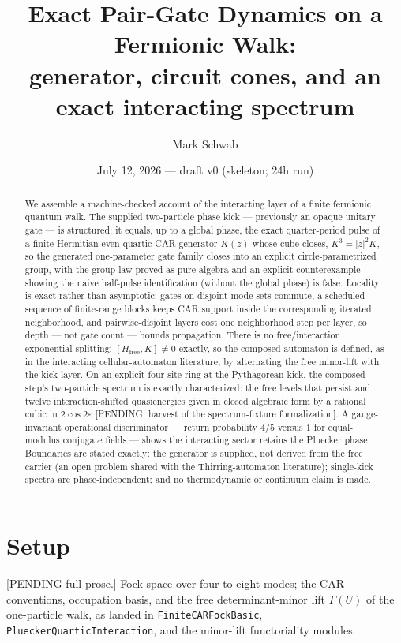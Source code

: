 \documentclass[11pt]{article}
\title{Exact Pair-Gate Dynamics on a Fermionic Walk:\\
generator, circuit cones, and an exact interacting spectrum}
\author{Mark Schwab}
\date{July 12, 2026 --- draft v0 (skeleton; 24h run)}
\begin{document}
\maketitle

\begin{abstract}
We assemble a machine-checked account of the interacting layer of a
finite fermionic quantum walk.  The supplied two-particle phase kick ---
previously an opaque unitary gate --- is structured: it equals, up to a
global phase, the exact quarter-period pulse of a finite Hermitian even
quartic CAR generator $K(z)$ whose cube closes, $K^3=|z|^2K$, so the
generated one-parameter gate family closes into an explicit
circle-parametrized group, with the group law proved as pure algebra and an explicit
counterexample showing the naive half-pulse identification (without the
global phase) is false.  Locality is exact rather than asymptotic:
gates on disjoint mode sets commute, a scheduled sequence of finite-range
blocks keeps CAR support inside the corresponding iterated neighborhood,
and pairwise-disjoint layers cost one neighborhood step per layer, so
depth --- not gate count --- bounds propagation.  There is no
free/interaction exponential splitting: $[H_{\mathrm{free}},K]\neq0$
exactly, so the composed automaton is defined, as in the interacting
cellular-automaton literature, by alternating the free minor-lift with
the kick layer.  On an explicit four-site ring at the Pythagorean kick,
the composed step's two-particle spectrum is exactly characterized:
the free levels that persist and twelve interaction-shifted quasienergies
given in closed algebraic form by a rational cubic in $2\cos2\varepsilon$
[PENDING: harvest of the spectrum-fixture formalization].  A
gauge-invariant operational discriminator --- return probability $4/5$
versus $1$ for equal-modulus conjugate fields --- shows the interacting
sector retains the Pluecker phase.  Boundaries are stated exactly: the
generator is supplied, not derived from the free carrier (an open
problem shared with the Thirring-automaton literature); single-kick
spectra are phase-independent; and no thermodynamic or continuum claim
is made.
\end{abstract}

\section{Setup}
[PENDING full prose.]  Fock space over four to eight modes; the CAR
conventions, occupation basis, and the free determinant-minor lift
$\Gamma(U)$ of the one-particle walk, as landed in
\texttt{FiniteCARFockBasic}, \texttt{PlueckerQuarticInteraction}, and the
minor-lift functoriality modules.
\end{document}
